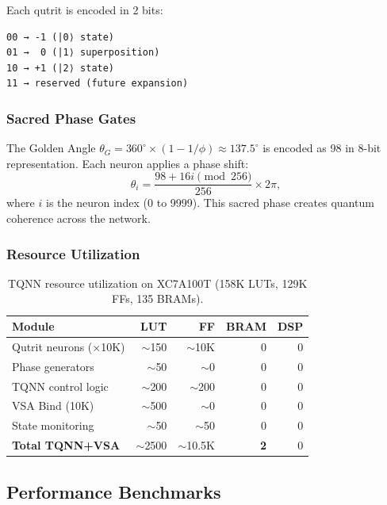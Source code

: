 \documentclass[aps,prd,preprint,superscriptaddress,showpacs,nofootinbib,longbibliography]{revtex4-2}
\begin{document}
Each qutrit is encoded in 2 bits:
\begin{verbatim}
00 → -1 (|0⟩ state)
01 →  0 (|1⟩ superposition)
10 → +1 (|2⟩ state)
11 → reserved (future expansion)
\end{verbatim}

\subsubsection{Sacred Phase Gates}

The Golden Angle $\theta_G = 360^\circ \times (1 - 1/\phi) \approx 137.5^\circ$ is encoded as 98 in 8-bit representation. Each neuron applies a phase shift:
\begin{equation}
\theta_i = \frac{98 + 16i \pmod{256}}{256} \times 2\pi,
\end{equation}
where $i$ is the neuron index (0 to 9999). This sacred phase creates quantum coherence across the network.

\subsubsection{Resource Utilization}

\begin{table}[ht]
\centering
\small
\begin{tabular}{lrrrr}
\toprule
\textbf{Module} & \textbf{LUT} & \textbf{FF} & \textbf{BRAM} & \textbf{DSP} \\
\midrule
Qutrit neurons ($\times$10K) & $\sim$150 & $\sim$10K & 0 & 0 \\
Phase generators & $\sim$50 & $\sim$0 & 0 & 0 \\
TQNN control logic & $\sim$200 & $\sim$200 & 0 & 0 \\
VSA Bind (10K) & $\sim$500 & $\sim$0 & 0 & 0 \\
State monitoring & $\sim$50 & $\sim$50 & 0 & 0 \\
\midrule
\textbf{Total TQNN+VSA} & $\sim$2500 & $\sim$10.5K & \textbf{2} & 0 \\
\bottomrule
\end{tabular}
\caption{TQNN resource utilization on XC7A100T (158K LUTs, 129K FFs, 135 BRAMs).}
\label{tab:tqnn_resources}
\end{table}

\subsection{Performance Benchmarks}
\end{document}
